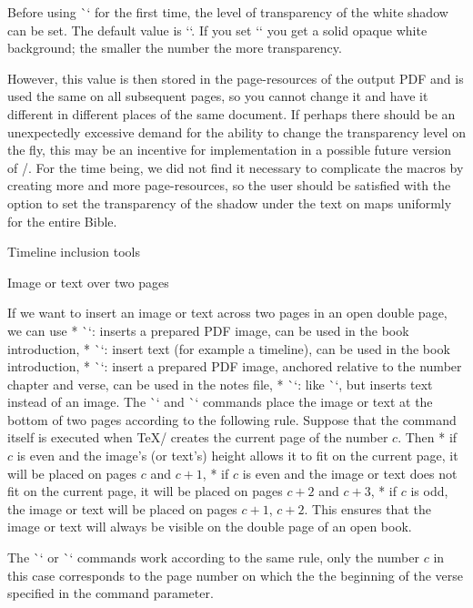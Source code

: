 {{Before using \`\putstext` for the first time, the level of transparency of the white shadow can be set.  The default value is `\def\shadowparameter{.1}`. 
If you set `\def\shadowparameter{1}` you get a solid opaque white background; the smaller the number the more transparency. 

However, this value is then stored in the page-resources of the output PDF and is used 
the same  on all subsequent pages, so you cannot change it and have it  different in 
different places of the same document. 
If perhaps there should be an unexpectedly excessive 
demand for the ability to change the transparency level on the fly, this may be an incentive for 
implementation in a possible future version of \OpBible/.
For the time being, we did not find it necessary to complicate the macros by creating more and more 
page-resources, so the user should be satisfied with the option to set the transparency of the 
shadow under the text on maps uniformly for the entire Bible.  



\sec Timeline inclusion tools

\secc[spanimage] Image or text over two pages

If we want to insert an image or text across two pages in an open double page, we can
use
\begitems
* \`\insertSpanImage`: inserts a prepared PDF image, can be used in the book introduction,
* \`\insertSpanText`: insert text (for example a timeline), can be used in the book introduction,
* \`\putSpanImage`: insert a prepared PDF image, anchored relative to the number
   chapter and verse, can be used in the notes file,
* \`\putSpanText`: like \`\putSpanImage`, but inserts text instead of an image.
\enditems
The \`\insertSpanImage` and \`\insertSpanText` commands place the image or text 
at the bottom of two pages according to the following rule. Suppose that
the command itself is executed when \TeX/ creates the current page of
the number $c$. Then
\begitems
* if $c$ is even and the image's (or text's) height allows it to fit on the current page,
  it will be placed on pages $c$ and $c+1$,
* if $c$ is even and the image or text does not fit on the current page,
  it will be placed on pages $c+2$ and $c+3$,
* if $c$ is odd, the image or text will be placed on pages $c+1$, $c+2$.
\enditems
This ensures that the image or text will always be visible on the double page
of an open book.

The \`\putSpanImage` or \`\putSpanText` commands work according to the same rule,
only the number $c$ in this case corresponds to the page number on which the
the beginning of the verse specified in the command parameter.

}}
